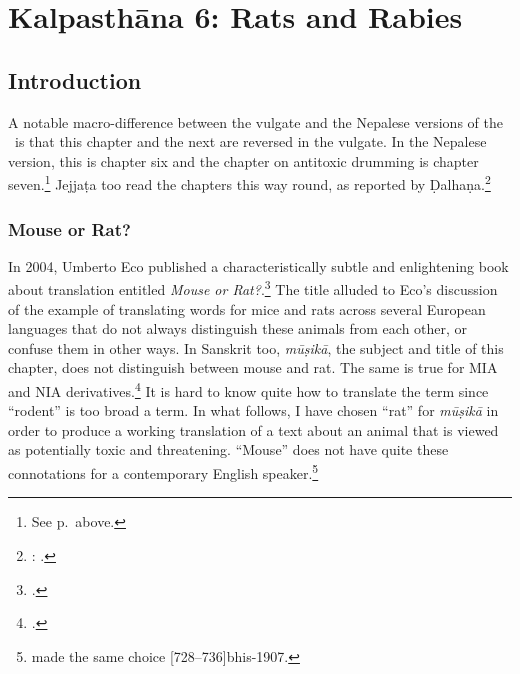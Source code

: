 \chapter{Kalpasthāna 6: Rats and Rabies}
\label{mūṣikā}


\section{Introduction}

A notable macro-difference between the vulgate and the Nepalese
versions of the \SS\ is that this chapter and the next are reversed
in the vulgate.  In the Nepalese version, this is chapter six and the
chapter on antitoxic drumming is chapter seven.\footnote{See
    p.\,\pageref{kalpa-chapter-sequence} above.}  Jejjaṭa too read the
    chapters this way round, as reported by
    Ḍalhaṇa.\footnote{\label{dalhana-rat-sequence}: 
    .}

\subsection{Mouse or Rat?}

In 2004, Umberto Eco published a characteristically subtle and
enlightening book about translation entitled \emph{Mouse or
    Rat?}.\footcite{eco-2004} The title alluded to Eco's discussion of
the example of translating words for mice and rats across several
European languages that do not always distinguish these animals from
each other, or confuse them in other ways.  In Sanskrit too,
\emph{mūṣikā}, the subject and title of this chapter, does not
distinguish between mouse and rat.  The same is true for MIA and NIA
derivatives.\footcite[\#10258]{CDIAL}  It is hard to know quite how
to translate the term since “rodent” is too broad a term.  In what
follows, I have chosen “rat” for \emph{mūṣikā} in order to produce a
working translation of a text about an animal that is viewed as
potentially toxic and threatening.  ``Mouse'' does not have quite
these connotations for a contemporary English
speaker.\footnote{\citeauthor{bhis-1907} made the same choice
    [728--736]{bhis-1907}.}

